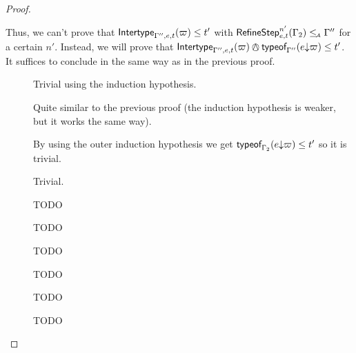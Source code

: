 \documentclass[a4paper]{article}
\theoremstyle{definition}
\begin{document}
\begin{proof}
\begin{description}
      Thus, we can't prove that $\textsf{Intertype}_{\Gamma'',e,t} (\varpi) \leq t'$ with $\textsf{RefineStep}_{e,t}^{n'} (\Gamma_2) \leq_{\!\scriptscriptstyle\mathcal{A}} \Gamma''$
      for a certain $n'$. Instead, we will prove that
      $\env {\Gamma'',e,t} (\varpi) \tsand \tyof {\occ e \varpi} {\Gamma''} \leq t'$.
      It suffices to conclude in the same way as in the previous proof.

      \begin{description}
        \item[] Trivial using the induction hypothesis.
        \item[] Quite similar to the previous proof (the induction hypothesis is weaker, but it works the same way).
        \item[] By using the outer induction hypothesis we get $\textsf{typeof}_{\Gamma_2}(e{\downarrow}\varpi) \leq t'$ so it is trivial.
        \item[] Trivial.
        \item[] TODO
        \item[] %
        TODO
    
        \item[] TODO%
        \item[] TODO%
        \item[] TODO%
        \item[] TODO%
      \end{description}
    \end{description}
  \end{proof}
\end{document}
